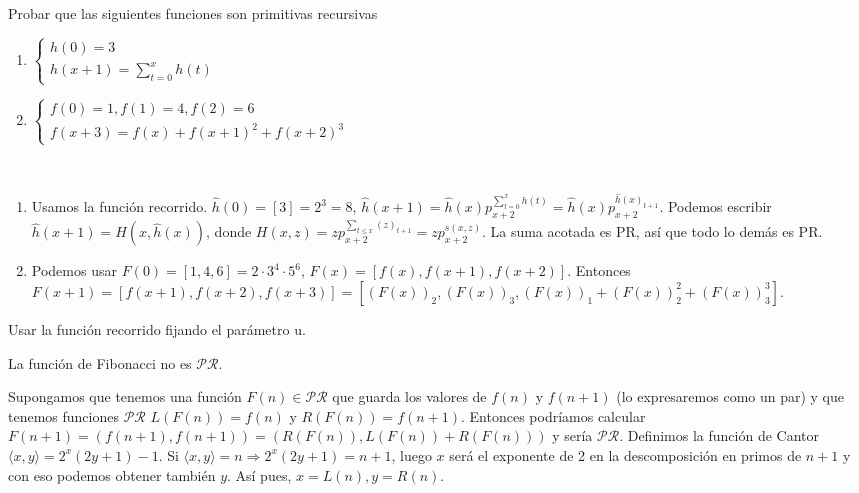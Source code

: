 \documentclass[twoside]{article}
\begin{document}
\newpage

\begin{ejercicio}{19}
Probar que las siguientes funciones son primitivas recursivas
\begin{enumerate}
\item $\begin{cases}
h(0) = 3\\
h(x + 1) =\sum_{t=0}^x h(t)
\end{cases}$

\item $\begin{cases}
f(0) = 1, f(1) = 4, f(2) = 6\\
f(x + 3) = f(x) + f(x + 1)^2 + f(x + 2)^3
\end{cases}$
\end{enumerate}
\end{ejercicio}
\begin{solucion}\
\begin{enumerate}
\item Usamos la función recorrido. $\hat{h}(0)=[3]=2^3=8$, $\hat{h}(x+1)=\hat{h}(x)p_{x+2}^{\sum_{t=0}^xh(t)}=\hat{h}(x)p_{x+2}^{\hat{h}(x)_{t+1}}$. Podemos escribir $\hat{h}(x+1)=H(x,\hat{h}(x))$, donde $H(x,z)=zp_{x+2}^{\sum_{t\leq x} (z)_{t+1}}=zp_{x+2}^{s(x,z)}$. La suma acotada es PR, así que todo lo demás es PR.
\item Podemos usar $F(0)=[1,4,6]=2\cdot 3^4\cdot 5^6$, $F(x)=[f(x),f(x+1),f(x+2)]$. Entonces $F(x+1)=[f(x+1),f(x+2),f(x+3)]=[(F(x))_2,(F(x))_3,(F(x))_1+(F(x))_2^2+(F(x))_3^3]$. 
\end{enumerate}
\end{solucion}

\newpage

\begin{ejercicio}{22}
\end{ejercicio}
\begin{solucion}
Usar la función recorrido fijando el parámetro u.
\end{solucion}
\newpage

\begin{ejercicio}{}
La función de Fibonacci no es $\mathcal{PR}$.
\end{ejercicio}
\begin{solucion}
Supongamos que tenemos una función $F(n)\in\mathcal{PR}$ que guarda los valores de $f(n)$ y $f(n+1)$ (lo expresaremos como un par) y que tenemos funciones $\mathcal{PR}$ $L(F(n))=f(n)$ y $R(F(n))=f(n+1)$. Entonces podríamos calcular $F(n+1)=(f(n+1),f(n+1))=(R(F(n)), L(F(n))+R(F(n)))$ y sería $\mathcal{PR}$. Definimos la función de Cantor $\langle x,y\rangle =2^x(2y+1)-1$. Si $\langle x,y\rangle =n\Rightarrow 2^x(2y+1)=n+1$, luego $x$ será el exponente de 2 en la descomposición en primos de $n+1$ y con eso podemos obtener también $y$. Así pues, $x=L(n), y=R(n)$. 
\end{solucion}
\end{document}
